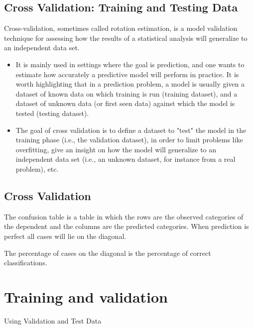 \documentclass[a4paper,12pt]{article}
\begin{document}
\subsection{Cross Validation: Training and Testing Data}

Cross-validation, sometimes called rotation estimation, is a model validation technique for assessing how the results of a statistical analysis will generalize to an independent data set.
\begin{itemize}
\item It is mainly used in settings where the goal is prediction, and one wants to estimate how accurately a predictive model will perform in practice. It is worth highlighting that in a prediction problem, a model is usually given a dataset of known data on which training is run (training dataset), and a dataset of unknown data (or first seen data) against which the model is tested (testing dataset).
\item The goal of cross validation is to define a dataset to "test" the model in the training phase (i.e., the validation dataset), in order to limit problems like overfitting, give an insight on how the model will generalize to an independent data set (i.e., an unknown dataset, for instance from a real problem), etc.
\end{itemize}

\subsection{Cross Validation}

The confusion
table is a table in which the rows are the observed categories of the dependent and
the columns are the predicted categories. When prediction is perfect all cases will lie on the
diagonal. 

The percentage of cases on the diagonal is the percentage of correct classifications. 


\section{Training and validation}
Using Validation and Test Data

\end{document}
